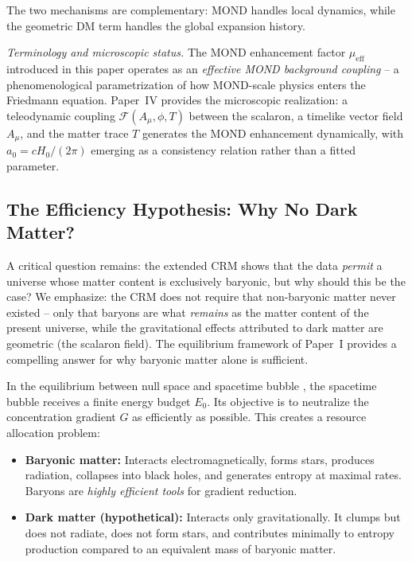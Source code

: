 \documentclass[aps,prd,twocolumn,superscriptaddress,nofootinbib]{revtex4-2}
\begin{document}
The two mechanisms are complementary: MOND handles local dynamics, while the geometric DM term handles the global expansion history.

\textit{Terminology and microscopic status.} The MOND enhancement factor $\mu_{\mathrm{eff}}$ introduced in this paper operates as an \emph{effective MOND background coupling} -- a phenomenological parametrization of how MOND-scale physics enters the Friedmann equation. Paper~IV \cite{Geiger2026d} provides the microscopic realization: a teleodynamic coupling $\mathcal{F}(A_\mu, \phi, T)$ between the scalaron, a timelike vector field $A_\mu$, and the matter trace $T$ generates the MOND enhancement dynamically, with $a_0 = cH_0/(2\pi)$ emerging as a consistency relation rather than a fitted parameter.

\subsection{The Efficiency Hypothesis: Why No Dark Matter?}
\label{subsec:efficiency}

A critical question remains: the extended CRM shows that the data \textit{permit} a universe whose matter content is exclusively baryonic, but why should this be the case? We emphasize: the CRM does not require that non-baryonic matter never existed -- only that baryons are what \textit{remains} as the matter content of the present universe, while the gravitational effects attributed to dark matter are geometric (the scalaron field). The equilibrium framework of Paper~I \cite{Geiger2026} provides a compelling answer for why baryonic matter alone is sufficient.

In the equilibrium between null space and spacetime bubble \cite{Geiger2026}, the spacetime bubble receives a finite energy budget $E_0$. Its objective is to neutralize the concentration gradient $G$ as efficiently as possible. This creates a resource allocation problem:

\begin{itemize}
\item \textbf{Baryonic matter:} Interacts electromagnetically, forms stars, produces radiation, collapses into black holes, and generates entropy at maximal rates. Baryons are \textit{highly efficient tools} for gradient reduction.

\item \textbf{Dark matter (hypothetical):} Interacts only gravitationally. It clumps but does not radiate, does not form stars, and contributes minimally to entropy production compared to an equivalent mass of baryonic matter.
\end{itemize}
\end{document}
